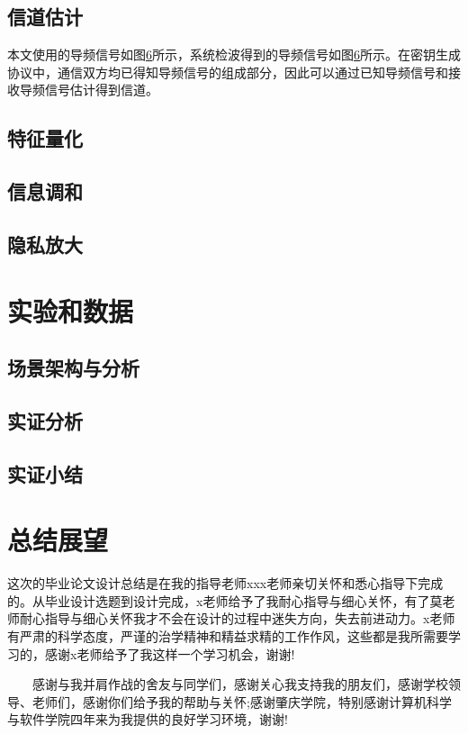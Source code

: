 \documentclass[master]{seuthesis} %
\begin{document}
\begin{Main}
\section{信道估计}

本文使用的导频信号如图\ref{}所示，系统检波得到的导频信号如图\ref{}所示。在密钥生成协议中，通信双方均已得知导频信号的组成部分，因此可以通过已知导频信号和接收导频信号估计得到信道。

\section{特征量化}
\section{信息调和}
\section{隐私放大}

\chapter{实验和数据}

\section{场景架构与分析}
\section{实证分析}
\section{实证小结}

\chapter{总结展望}

\end{Main} %

\begin{Acknowledgement}{}
这次的毕业论文设计总结是在我的指导老师xxx老师亲切关怀和悉心指导下完成的。从毕业设计选题到设计完成，x老师给予了我耐心指导与细心关怀，有了莫老师耐心指导与细心关怀我才不会在设计的过程中迷失方向，失去前进动力。x老师有严肃的科学态度，严谨的治学精神和精益求精的工作作风，这些都是我所需要学习的，感谢x老师给予了我这样一个学习机会，谢谢!

　　感谢与我并肩作战的舍友与同学们，感谢关心我支持我的朋友们，感谢学校领导、老师们，感谢你们给予我的帮助与关怀;感谢肇庆学院，特别感谢计算机科学与软件学院四年来为我提供的良好学习环境，谢谢!
\end{Acknowledgement}





\newpage
\printindex %



% 
% 
\end{document}
